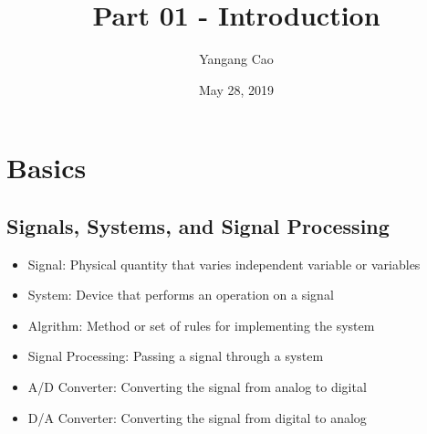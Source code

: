 \documentclass[10pt,a4paper,oneside]{article}
\author{Yangang Cao}
\date{May 28, 2019}
\begin{document}
\title{Part 01 - Introduction}
\maketitle 
\tableofcontents
\newpage
\section{Basics}
\subsection{Signals, Systems, and Signal Processing}
\begin{itemize}
\item  Signal: Physical quantity that varies independent variable or variables
\item  System: Device that performs an operation on a signal
\item Algrithm: Method or set of rules for implementing the system
\item Signal Processing: Passing a signal through a system
\item A/D Converter: Converting the signal from analog to digital
\item D/A Converter: Converting the signal from digital to analog
\end{itemize}
\end{document}

